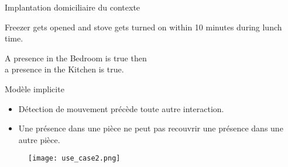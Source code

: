 \begin{frame}{Implantation domiciliaire du contexte}
  \addtocounter{framenumber}{-1}
\begin{minipage}{.48\linewidth}
    \begin{coloredbox}[black]{}
      \begin{scriptsize}
        Freezer gets opened and stove gets turned on within 10 minutes during lunch time.
      \end{scriptsize}
    \end{coloredbox}
  \end{minipage}
  \hfill
  \begin{minipage}{.48\linewidth}
    \begin{coloredbox}[black]{}
      \begin{scriptsize}
        A presence in the Bedroom is true then\\ a presence in the Kitchen is true.%
      \end{scriptsize}
    \end{coloredbox}
  \end{minipage}
  \vfill

  \begin{minipage}{0.45\linewidth}
\begin{coloredbox}[teal]{Modèle implicite}
\small
    \begin{itemize}
    \item Détection de mouvement précède toute autre interaction.
    \item Une présence dans une pièce ne peut pas recouvrir une présence dans une autre pièce.
    \end{itemize}
\end{coloredbox}
  \end{minipage}
  \hfill
  \begin{minipage}{0.50\linewidth}
    \begin{figure}
      \texttt{[image: use\_case2.png]}
    \end{figure}
  \end{minipage}
\end{frame}
